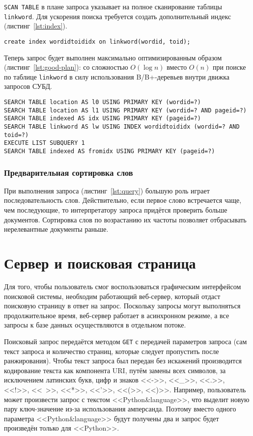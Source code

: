 \verb|SCAN TABLE| в плане запроса указывает на полное сканирование таблицы \verb|linkword|. Для ускорения поиска требуется создать дополнительный индекс (листинг~\ref{lst:index}).
\begin{lstlisting}[language=sqlite, caption=Создание индекса., label=lst:index]
create index wordidtoididx on linkword(wordid, toid);
\end{lstlisting}

Теперь запрос будет выполнен максимально оптимизированным образом (листинг~\ref{lst:good-plan}): со сложностью $O(\log n)$ вместо $O(n)$ при поиске по таблице \verb|linkword| в силу использования B/B+-деревьев внутри движка запросов СУБД.
\begin{lstlisting}[language=sql-explain, caption=Оптимальный план выполнения запроса., label=lst:good-plan]
SEARCH TABLE location AS l0 USING PRIMARY KEY (wordid=?)
SEARCH TABLE location AS l1 USING PRIMARY KEY (wordid=? AND pageid=?)
SEARCH TABLE indexed AS idx USING PRIMARY KEY (pageid=?)
SEARCH TABLE linkword AS lw USING INDEX wordidtoididx (wordid=? AND toid=?)
EXECUTE LIST SUBQUERY 1
SEARCH TABLE indexed AS fromidx USING PRIMARY KEY (pageid=?)
\end{lstlisting}


\subsubsection{Предварительная сортировка слов}
При выполнения запроса (листинг~\ref{lst:query}) большую роль играет последовательность слов. Действительно, если первое слово встречается чаще, чем последующие, то интерпретатору запроса придётся проверить больше документов. Сортировка слов по возрастанию их частоты позволяет отбрасывать нерелевантные документы раньше.


\section{Сервер и поисковая страница}
Для того, чтобы пользователь смог воспользоваться графическим интерфейсом поисковой системы, необходим работающий веб-сервер, который отдаст поисковую страницу в ответ на запрос. Поскольку запросы могут выполняться продолжительное время, веб-сервер работает в асинхронном режиме, а все запросы к базе данных осуществляются в отдельном потоке.

Поисковый запрос передаётся методом \verb|GET| с передачей параметров запроса (сам текст запроса и количество страниц, которые следует пропустить после ранжирования). Чтобы текст запроса был передан без искажений производится кодирование текста как компонента URI, путём замены всех символов, за исключением латинских букв, цифр и знаков <<->>, <<\_>>, <<.>>, <<!>>, <<~>>, <<*>>, <<'>>, <<(>>, <<)>>. Например, пользователь может произвести запрос с текстом <<Python\&language>>, что выделит новую пару ключ-значение из-за использования амперсанда. Поэтому вместо одного параметра <<Python\&language>> будут получены два и запрос будет произведён только для <<Python>>.
